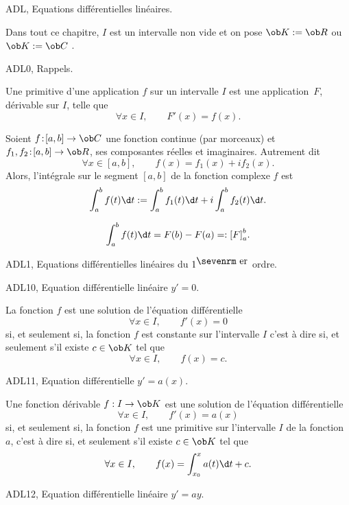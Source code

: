                                              






\Chapter ADL, Equations diff\'erentielles lin\'eaires.
\bigskip

Dans tout ce chapitre, $I$ est un intervalle non vide  et on pose  $\ob K:=\ob R$ ou $\ob K:=\ob C$ . 
\bigskip

\Section ADL0, Rappels. 

\Definition []  Une primitive d'une application $f$ sur un intervalle $I$ est une application~$F$, d\'erivable sur $I$, telle que 
$$
\forall x\in I, \qquad F'(x)=f(x).
$$

\Definition []  Soient $f\!:\![a,b]\to\ob C$ une fonction continue (par morceaux) et $f_1,f_2\!:\![a,b]\to\ob R$, ses composantes r\'eelles et imaginaires. Autrement dit 
$$
\forall x\in[a,b],\qquad f(x)=f_1(x)+if_2(x).
$$
Alors, l'int\'egrale sur le segment $[a,b]$ de la fonction complexe $f$ est 
$$
\int_a^bf(t)\d t:=\int_a^bf_1(t)\d t+i\int_a^bf_2(t)\d t.
$$

$$
\int_a^bf(t)\d t=F(b)-F(a)=:{[F]}_a^b.
$$

\Section ADL1, Equations diff\'erentielles lin\'eaires du $1^{\mbox{\sevenrm er}}$ ordre.

\Subsection ADL10, Equation diff\'erentielle lin\'eaire $y'=0$. 

La fonction $f$ est une solution de l'\'equation diff\'erentielle 
$$
\forall x\in I , \qquad  f'(x)=0 
$$
si, et seulement si, la fonction $f$ est constante sur l'intervalle $I$  c'est  \`a  dire  si,  et  seulement  s'il  existe
$c\in\ob K$  tel que $$ 
\forall x\in I , \qquad f(x)=c.
$$

\Subsection ADL11, Equation diff\'erentielle $y'=a(x)$. 

Une fonction d\'erivable  $f:I\to\ob K$  est une solution de l'\'equation diff\'erentielle 
$$
\forall x\in I , \qquad  f'(x)=a(x) 
$$
si, et seulement si, la fonction $f$ est une primitive sur l'intervalle $I$ de la fonction $a$, c'est \`a dire
si,  et seulement s'il existe $c\in\ob K$ tel que 
$$ 
\forall x\in I, \qquad f(x)=\int_{x_0}^xa(t)\d t+c. 
$$


\Subsection ADL12, Equation diff\'erentielle lin\'eaire $y'=ay$. 

